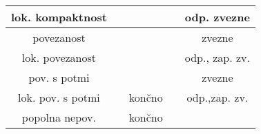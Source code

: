 \documentclass[10pt,a4paper]{article}
\newcommand{\cmark}{\checkmark}%
\newcommand{\xmark}{\ding{55}}%
\begin{document}
\begin{table}
\begin{tabular}{|c|c|c|c|c|}
        lok. kompaktnost  &       & \cmark& \xmark& odp. zvezne   \\ \hline
        povezanost        &       & \cmark& \cmark& zvezne        \\ \hline
        lok. povezanost   &       & \cmark& \cmark& odp., zap. zv.\\ \hline
        pov. s potmi      &       & \cmark& \cmark& zvezne        \\ \hline
        lok. pov. s potmi &       & končno& \cmark& odp.,zap. zv. \\ \hline
        popolna nepov.    &       & končno& \xmark&               \\ \hline
    \end{tabular}
\end{table}

\end{document}
